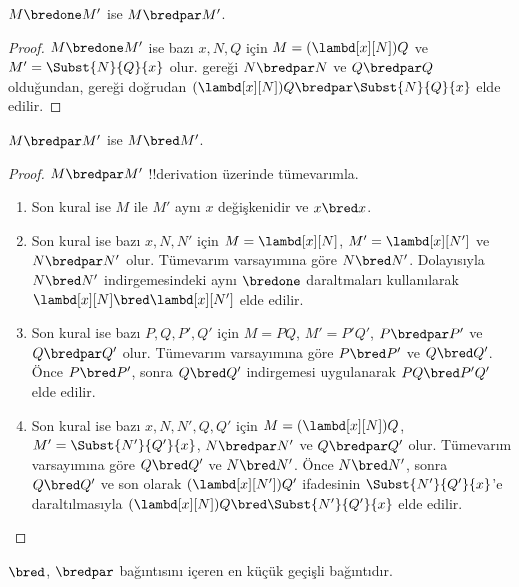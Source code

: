 \documentclass[../../../include/open-logic-section]{subfiles}
\begin{document}


\begin{lem}
  $M \bredone M'$ ise $M \bredpar M'$.
\end{lem}
\begin{proof} $M \bredone M'$ ise bazı $x,N,Q$ için
    $M=(\lambd[x][N])Q$ ve $M'=\Subst{N}{Q}{x}$ olur.
     gereği $N\bredpar N$ ve $Q\bredpar Q$ olduğundan,
     gereği doğrudan
    $(\lambd[x][N])Q\bredpar\Subst{N}{Q}{x}$ elde edilir.
\end{proof}

\begin{lem}
  $M \bredpar M'$ ise $M \bred M'$.
\end{lem}

\begin{proof} $M \bredpar M'$ !!{derivation} üzerinde tümevarımla.
  \begin{enumerate}
  \item Son kural  ise $M$ ile $M'$ aynı $x$
    değişkenidir ve $x\bred x$.
  \item Son kural  ise bazı $x,N,N'$ için
    $M=\lambd[x][N]$, $M'=\lambd[x][N']$ ve $N\bredpar N'$ olur.
    Tümevarım varsayımına göre $N\bred N'$. Dolayısıyla $N\bred N'$
    indirgemesindeki aynı $\bredone$ daraltmaları kullanılarak
    $\lambd[x][N]\bred\lambd[x][N']$ elde edilir.
  \item Son kural  ise bazı $P,Q,P',Q'$ için
    $M=PQ$, $M'=P'Q'$, $P\bredpar P'$ ve $Q\bredpar Q'$ olur. Tümevarım
    varsayımına göre $P\bred P'$ ve $Q\bred Q'$. Önce $P\bred P'$, sonra
    $Q\bred Q'$ indirgemesi uygulanarak $PQ\bred P'Q'$ elde edilir.
  \item Son kural  ise bazı $x,N,N',Q,Q'$ için
    $M=(\lambd[x][N])Q$, $M'=\Subst{N'}{Q'}{x}$,
    $N\bredpar N'$ ve $Q\bredpar Q'$ olur. Tümevarım varsayımına göre
    $Q\bred Q'$ ve $N\bred N'$. Önce $N\bred N'$, sonra $Q\bred Q'$ ve
    son olarak $(\lambd[x][N'])Q'$ ifadesinin
    $\Subst{N'}{Q'}{x}$'e daraltılmasıyla
    $(\lambd[x][N])Q\bred\Subst{N'}{Q'}{x}$ elde edilir.
  \end{enumerate}
\end{proof}

\begin{lem}
  $\bred$, $\bredpar$ bağıntısını içeren en küçük geçişli bağıntıdır.
\end{lem}
\end{document}
